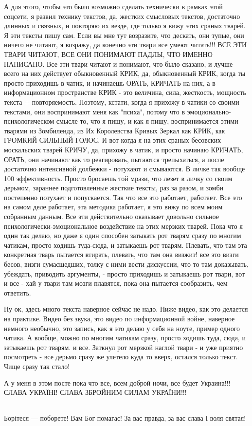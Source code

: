 А для этого, чтобы это было возможно сделать технически в рамках этой соцсети,
я развил технику текстов, да, жестких смысловых текстов, достаточно длинных и
связных, и повторяю их везде, где только я вижу этих сраных тварей. Я эти
тексты пишу сам. Если вы мне тут возразите, что дескать, они тупые, они ничего
не читают, я возражу, да конечно эти твари все умеют читать!!! ВСЕ ЭТИ ТВАРИ
ЧИТАЮТ, ВСЕ ОНИ ПОНИМАЮТ ПАДЛЫ, ЧТО ИМЕННО НАПИСАНО. Все эти твари читают и
понимают, что было сказано, и лучше всего на них действует обыкновенный КРИК,
да, обыкновенный КРИК, когда ты просто приходишь в чатик, и начинаешь ОРАТЬ,
КРИЧАТЬ на них, а в информационном пространстве КРИК - это величина, сила,
жесткость, мощность текста + повторяемость. Поэтому, кстати, когда я прихожу в
чатики со своими текстами, они воспринимают меня как "психа", потому что в
эмоционально-психологическом смысле то, что я пишу, и как я пишу,
воспринимается этими тварями из Зомбиленда, из Их Королевства Кривых Зеркал как
КРИК, как ГРОМКИЙ СИЛЬНЫЙ ГОЛОС. И вот когда я на этих сраных бесовских
москальских тварей КРИЧУ, да, прихожу в чатик, и просто начинаю КРИЧАТЬ, ОРАТЬ,
они начинают как то реагировать, пытаются трепыхаться, а после достаточно
интенсивной долбежки - потухают и смываются. В личке так вообще 100%
эффективность. Просто бросаешь той мрази, что лезет в личку со своим дерьмом,
зараннее подготовленные жесткие тексты, раз за разом, и зомби постепенно
потухает и попускается. Так что все это работает, работает. Все это на самом
деле работает, эта методика работает, я это вижу по всем моим собранным данным.
Все эти действительно оказывает довольно сильное психологически-эмоциональное
воздействие на этих мерзких тварей. Пока что я один так делаю, но даже я один
способен затыкать рот тварям сразу по многим чатикам, просто ходишь туда-сюда,
и затыкаешь рот тварям.  Плевать, что там эта конкретная тварь пытается
втирать, плевать, что там она визжит! все это визги бесов, визги сумасшедших,
толку с ними вести дискуссии, что то там доказывать, убеждать, приводить
аргументы, - просто приходишь и затыкаешь рот твари, вот и все - хай у твари
там мозги плавятся, пока она пытается сообразить, чем ответить. 

Ну ок, здесь много текста наверное сейчас не надо. Ниже видео, как это делается
на практике. Видео без звука, это видео по информационной войне, наверное
немного необычно, это запись, как я это делаю у себя на ноуте, пример одного
чатика. А вообще, можно по многим чатикам сразу, просто ходишь туда, сюда, и
затыкаешь рот тварям. и все. Заткнул рот мерзкой наглой твари - и уже приятно
посмотреть - все дерьмо сразу же улетело куда то вверх, остался только текст.
Чище сразу так стало! 

А у меня в этом посте пока что все, всем доброй ночи, все будет Украина!!!
СЛАВА УКРАЇНІ! СЛАВА ЗБРОЙНИМ СИЛАМ УКРАЇНИ!!!  💛 💙 💛 💙 💛 💙 💛 💙 💛 💙
💛 💙 💛 💙 💛 💙 💛 💙 💛 💙 💛 💙 💛 💙

Борітеся — поборете! Вам Бог помагає!  За вас правда, за вас слава І воля
святая!

💛 💙 💛 💙 💛 💙 💛 💙 💛 💙 💛 💙 💛 💙 💛 💙 💛 💙 💛 💙 💛 💙 💛 💙
